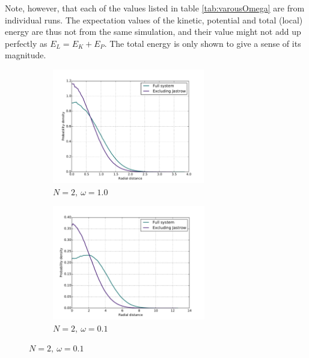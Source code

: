 \documentclass[english, a4paper]{article}
\begin{document}
	Note, however, that each of the values listed in table \ref{tab:varousOmega} are from individual runs.
	The expectation values of the kinetic, potential and total (local) energy are thus not from the same simulation, and their value might not add up perfectly as $E_L = E_K + E_P$.
	The total energy is only shown to give a sense of its magnitude.
	
	\begin{figure}[H]
		
		\begin{subfigure}{0.5\textwidth}
			\includegraphics[width=\textwidth, height= 5cm]{figures/radialDistribution/OneBodyDensityN2w100Se7.pdf}
			\caption{$N=2,\:\omega=1.0$}
		\end{subfigure}
		\begin{subfigure}{0.5\textwidth}
			\includegraphics[width=\textwidth, height= 5cm]{figures/radialDistribution/OneBodyDensityN2w10Se7.pdf}
			\caption{$N=2,\:\omega=0.1$}
		\end{subfigure}
		
		\vspace{1mm}
		

\end{figure}
\end{document}
